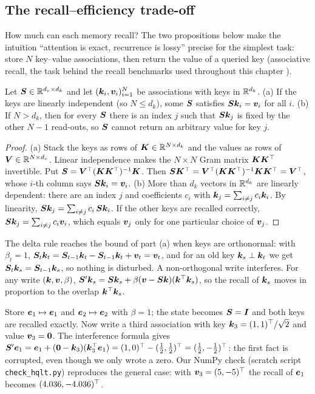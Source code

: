 \subsection{The recall--efficiency trade-off}\label{sec:c12-tradeoff}

How much can each memory recall? The two propositions below make the intuition ``attention
is exact, recurrence is lossy'' precise for the simplest task: store $N$ key--value
associations, then return the value of a queried key (associative recall, the task behind the
recall benchmarks used throughout this chapter \citep{c02-arora2024based}).

\begin{proposition}\label{prop:c12-capacity}
Let $\bm{S} \in \mathbb{R}^{d_v\times d_k}$ and let $(\bm{k}_i, \bm{v}_i)_{i=1}^N$ be associations with keys in
$\mathbb{R}^{d_k}$. (a) If the keys are linearly independent (so $N\le d_k$), some $\bm{S}$ satisfies
$\bm{S}\bm{k}_i = \bm{v}_i$ for all $i$. (b) If $N > d_k$, then for every $\bm{S}$ there is an index $j$
such that $\bm{S}\bm{k}_j$ is fixed by the other $N-1$ read-outs, so $\bm{S}$ cannot return an arbitrary
value for key $j$.
\end{proposition}
\begin{proof}
(a) Stack the keys as rows of $\bm{K} \in \mathbb{R}^{N\times d_k}$ and the values as rows of $\bm{V} \in
\mathbb{R}^{N\times d_v}$. Linear independence makes the $N\times N$ Gram matrix $\bm{K}\bm{K}^{\top}$ invertible.
Put $\bm{S} = \bm{V}^{\top}(\bm{K}\bm{K}^{\top})^{-1}\bm{K}$. Then $\bm{S}\bm{K}^{\top} = \bm{V}^{\top}(\bm{K}\bm{K}^{\top})^{-1}\bm{K}\bm{K}^{\top} = \bm{V}^{\top}$,
whose $i$-th column says $\bm{S}\bm{k}_i = \bm{v}_i$.
(b) More than $d_k$ vectors in $\mathbb{R}^{d_k}$ are linearly dependent: there are an index $j$ and
coefficients $c_i$ with $\bm{k}_j = \sum_{i\neq j}c_i\bm{k}_i$. By linearity, $\bm{S}\bm{k}_j =
\sum_{i\ne j}c_i\,\bm{S}\bm{k}_i$. If the other keys are recalled correctly, $\bm{S}\bm{k}_j =
\sum_{i\ne j}c_i\bm{v}_i$, which equals $\bm{v}_j$ only for one particular choice of $\bm{v}_j$.
\end{proof}

The delta rule reaches the bound of part (a) when keys are orthonormal: with $\beta_t = 1$,
$\bm{S}_t\bm{k}_t = \bm{S}_{t-1}\bm{k}_t - \bm{S}_{t-1}\bm{k}_t + \bm{v}_t = \bm{v}_t$, and for an old key $\bm{k}_s \perp
\bm{k}_t$ we get $\bm{S}_t\bm{k}_s = \bm{S}_{t-1}\bm{k}_s$, so nothing is disturbed. A non-orthogonal write
interferes. For any write $(\bm{k},\bm{v},\beta)$, $\bm{S}'\bm{k}_s = \bm{S}\bm{k}_s +
\beta(\bm{v} - \bm{S}\bm{k})(\bm{k}^{\top}\bm{k}_s)$, so the recall of $\bm{k}_s$ moves in proportion to the overlap
$\bm{k}^{\top}\bm{k}_s$.

\begin{example}[Interference with $d_k = 2$]\label{ex:c12-interference}
Store $\bm{e}_1\mapsto\bm{e}_1$ and $\bm{e}_2\mapsto\bm{e}_2$ with $\beta=1$; the state becomes $\bm{S}=\bm{I}$
and both keys are recalled exactly. Now write a third association with key $\bm{k}_3 =
(1,1)^{\top}/\sqrt2$ and value $\bm{v}_3 = \bm{0}$. The interference formula gives $\bm{S}'\bm{e}_1 = \bm{e}_1 +
(\bm{0}-\bm{k}_3)(\bm{k}_3^{\top}\bm{e}_1) = (1,0)^{\top} - (\tfrac12,\tfrac12)^{\top} = (\tfrac12,-\tfrac12)^{\top}$: the
first fact is corrupted, even though we only wrote a zero. Our NumPy check (scratch script
\texttt{check\_hqlt.py}) reproduces the general case: with $\bm{v}_3 = (5,-5)^{\top}$ the recall of
$\bm{e}_1$ becomes $(4.036,-4.036)^{\top}$.
\end{example}

